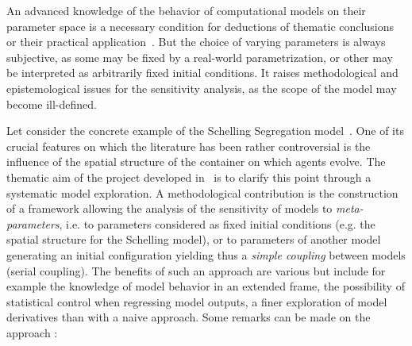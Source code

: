 An advanced knowledge of the behavior of computational models on their parameter space is a necessary condition for deductions of thematic conclusions or their practical application~\cite{banos2013pour}. But the choice of varying parameters is always subjective, as some may be fixed by a real-world parametrization, or other may be interpreted as arbitrarily fixed initial conditions. It raises methodological and epistemological issues for the sensitivity analysis, as the scope of the model may become ill-defined.

Let consider the concrete example of the Schelling Segregation model~\cite{schelling1971dynamic}. One of its crucial features on which the literature has been rather controversial is the influence of the spatial structure of the container on which agents evolve.%
 The thematic aim of the project developed in~\cite{cottineau2015revisiting} is to clarify this point through a systematic model exploration. A methodological contribution is the construction of a framework allowing the analysis of the sensitivity of models to \emph{meta-parameters}, i.e. to parameters considered as fixed initial conditions (e.g. the spatial structure for the Schelling model), or to parameters of another model generating an initial configuration%
 yielding thus a \emph{simple coupling} between models (serial coupling). The benefits of such an approach are various but include for example the knowledge of model behavior in an extended frame, the possibility of statistical control when regressing model outputs, a finer exploration of model derivatives than with a naive approach. Some remarks can be made on the approach :
